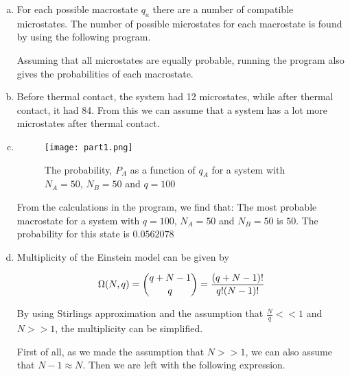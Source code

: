 \documentclass[a4paper,norsk,12pt,oneside]{article}
\begin{document}
\begin{enumerate}[a)]
    \item

        For each possible macrostate \(q_a\) there are a number of compatible microstates. 
        The number of possible microstates for each macrostate is found by using the
        following program. 

            

        Assuming that all microstates are equally probable, running the program also
        gives the probabilities of each macrostate.

    \item

        Before thermal contact, the system had 12 microstates, while after thermal 
        contact, it had 84. From this we can assume that a system has a lot more
        microstates after thermal contact. 

    \item

        \begin{figure}[H]
            \centering %
            \texttt{[image: part1.png]}
            \caption{The probability, \(P_A\) as a function of \(q_A\) for a system with \(N_A = 50\), \(N_B = 50\) and \(q = 100\)} 
            \end{figure}  

        From the calculations in the program, we find that:
        The most probable macrostate for a system with \(q = 100\), \(N_A = 50\) and \(N_B = 
        50\) is \(50\). 
        The probability for this state is \(0.0562078\)

        

    \item

        Multiplicity of the Einstein model can be given by

        \begin{equation}
            \label{eq:2}
            \Omega(N,q) = \binom{q + N -1}{q} = \frac{(q + N - 1)!}{q!(N - 1)!}\\ 
        \end{equation}

        By using Stirlings approximation and the assumption that \(\frac{N}{q}<<1\)
        and \(N>>1\), the multiplicity can be simplified. 

        First of all, as we made the assumption that \(N>>1\), we can also assume that
        \(N -1 \approx N\). Then we are left with the following expression.


\end{enumerate}
\end{document}
